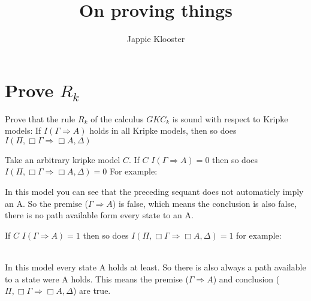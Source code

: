 \documentclass{article}
\begin{document}
\author{Jappie Klooster}
\title{On proving things}
\maketitle

\section{Prove $R_k$}
Prove that the rule $R_k$ of the calculus $GKC_k$ is sound with respect to
Kripke models: If $I(\Gamma \Rightarrow A)$ holds in all Kripke models, then
so does $I(\Pi, \Box \Gamma \Rightarrow \Box A, \Delta)$

\begin{prooftree}
\end{prooftree}

Take an arbitrary kripke model $C$. If $C$ $I(\Gamma \Rightarrow A)=0$ then
so does $I(\Pi, \Box \Gamma \Rightarrow \Box A, \Delta) = 0$ For example:


In this model you can see that the preceding sequant does not automaticly
imply an A. So the premise ($\Gamma \Rightarrow A$) is false, 
which means the conclusion is also false,
there is no path available form every state to an A.

 If $C$ $I(\Gamma \Rightarrow A)=1$ then
so does $I(\Pi, \Box \Gamma \Rightarrow \Box A, \Delta) = 1$ for example:
\\
\\
In this model every state A holds at least.
So there is also always a path available to a state were A holds.
This means the premise ($\Gamma \Rightarrow A$) and conclusion
($\Pi, \Box \Gamma \Rightarrow \Box A, \Delta$) are true.
\end{document}
